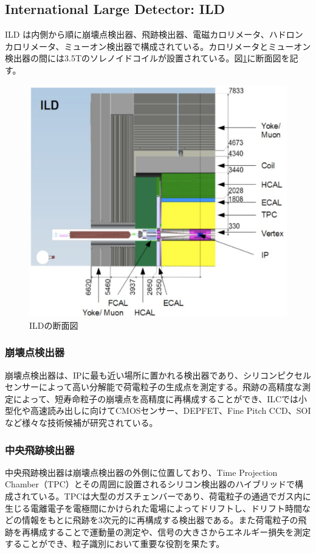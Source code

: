 \subsection{International Large Detector: ILD}
ILD は内側から順に崩壊点検出器、飛跡検出器、電磁カロリメータ、ハドロンカロリメータ、ミューオン検出器で構成されている。カロリメータとミューオン検出器の間には3.5Tのソレノイドコイルが設置されている。図\ref{ild}に断面図を記す。
\begin{figure}[h]
	\begin{center}
 \includegraphics[keepaspectratio, scale=0.3]
 	{Figure/Introduction/ild.png}
 		\caption {ILDの断面図}
 		\label{ild}
	\end{center}
\end{figure}
\subsubsection{崩壊点検出器}
崩壊点検出器は、IPに最も近い場所に置かれる検出器であり、シリコンピクセルセンサーによって高い分解能で荷電粒子の生成点を測定する。飛跡の高精度な測定によって、短寿命粒子の崩壊点を高精度に再構成することができ、ILCでは小型化や高速読み出しに向けてCMOSセンサー、DEPFET、Fine Pitch CCD、SOIなど様々な技術候補が研究されている。
\subsubsection{中央飛跡検出器}
中央飛跡検出器は崩壊点検出器の外側に位置しており、Time Projection Chamber（TPC）とその周囲に設置されるシリコン検出器のハイブリッドで構成されている。TPCは大型のガスチェンバーであり、荷電粒子の通過でガス内に生じる電離電子を電極間にかけられた電場によってドリフトし、ドリフト時間などの情報をもとに飛跡を3次元的に再構成する検出器である。また荷電粒子の飛跡を再構成することで運動量の測定や、信号の大きさからエネルギー損失を測定することができ、粒子識別において重要な役割を果たす。
